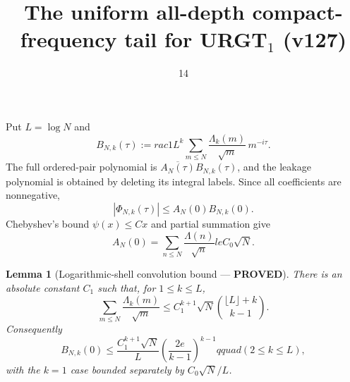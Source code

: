 \documentclass[11pt]{article}
\title{The uniform all-depth compact-frequency tail for URGT$_1$ (v127)}
\date{14}
\newcommand{\PROVED}{\textcolor{green!40!black}{\textbf{PROVED}}}
\newtheorem{lemma}{Lemma}
\begin{document}
\maketitle

Put $L=\log N$ and
\begin{equation}
 B_{N,k}(\tau):=rac1{L^k}
 \sum_{m\le N}\frac{\Lambda_k(m)}{\sqrt m}\,m^{-i\tau}.
                                                                    \tag{1}
\end{equation}
The full ordered-pair polynomial is
$\overline{A_N(\tau)}B_{N,k}(\tau)$, and the leakage polynomial is
obtained by deleting its integral labels.  Since all coefficients are
nonnegative,
\begin{equation}
 |\Phi_{N,k}(\tau)|
 \le A_N(0)B_{N,k}(0).                                    \tag{2}
\end{equation}
Chebyshev's bound $\psi(x)\le Cx$ and partial summation give
\begin{equation}
 A_N(0)=\sum_{n\le N}\frac{\Lambda(n)}{\sqrt n}le C_0\sqrt N.
                                                                    \tag{3}
\end{equation}

\begin{lemma}[Logarithmic-shell convolution bound --- \PROVED]
There is an absolute constant $C_1$ such that, for $1\le k\le L$,
\begin{equation}
 \sum_{m\le N}\frac{\Lambda_k(m)}{\sqrt m}
 \le
 C_1^{k+1}\sqrt N
 \binom{\lfloor L\rfloor+k}{k-1}.                         \tag{4}
\end{equation}
Consequently
\begin{equation}
 B_{N,k}(0)
 \le\frac{C_1^{k+1}\sqrt N}{L}
 \left(\frac{2e}{k-1}\right)^{k-1}qquad(2\le k\le L),   \tag{5}
\end{equation}
with the $k=1$ case bounded separately by $C_0\sqrt N/L$.
\end{lemma}
\end{document}
